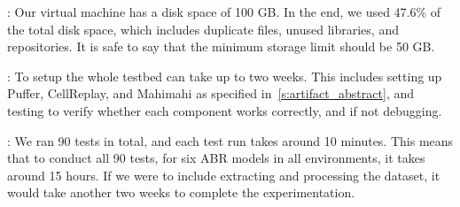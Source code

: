 :
%
Our virtual machine has a disk space of 100 GB. In the end, we used 47.6\% of the total disk space, which includes duplicate files, unused libraries, and repositories. It is safe to say that the minimum storage limit should be 50 GB.

:
%
To setup the whole testbed can take up to two weeks. This includes setting up Puffer, CellReplay, and Mahimahi as specified in~\ref{s:artifact_abstract}, and testing to verify whether each component works correctly, and if not debugging.

:
%
We ran 90 tests in total, and each test run takes around 10 minutes. This means that to conduct all 90 tests, for six ABR models in all environments, it takes around 15 hours. If we were to include extracting and processing the dataset, it would take another two weeks to complete the experimentation.


